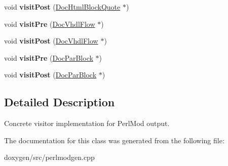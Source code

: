 \begin{DoxyCompactItemize}
void {\bfseries visit\+Post} (\mbox{\hyperlink{class_doc_html_block_quote}{Doc\+Html\+Block\+Quote}} $\ast$)
\item 
\mbox{\label{class_perl_mod_doc_visitor_abe7e71d4b2d45f7988f9c48d7ab9c191}} 
void {\bfseries visit\+Pre} (\mbox{\hyperlink{class_doc_vhdl_flow}{Doc\+Vhdl\+Flow}} $\ast$)
\item 
\mbox{\label{class_perl_mod_doc_visitor_ac7c692999a03dc8ab8c9306cb256e0ec}} 
void {\bfseries visit\+Post} (\mbox{\hyperlink{class_doc_vhdl_flow}{Doc\+Vhdl\+Flow}} $\ast$)
\item 
\mbox{\label{class_perl_mod_doc_visitor_ac1ba7699b4888a726a3afdf1ba71e9a4}} 
void {\bfseries visit\+Pre} (\mbox{\hyperlink{class_doc_par_block}{Doc\+Par\+Block}} $\ast$)
\item 
\mbox{\label{class_perl_mod_doc_visitor_a4fd19386e80be754e3d57fc809ed52f9}} 
void {\bfseries visit\+Post} (\mbox{\hyperlink{class_doc_par_block}{Doc\+Par\+Block}} $\ast$)
\end{DoxyCompactItemize}


\subsection{Detailed Description}
Concrete visitor implementation for Perl\+Mod output. 

The documentation for this class was generated from the following file\+:\begin{DoxyCompactItemize}
\item 
doxygen/src/perlmodgen.\+cpp\end{DoxyCompactItemize}
